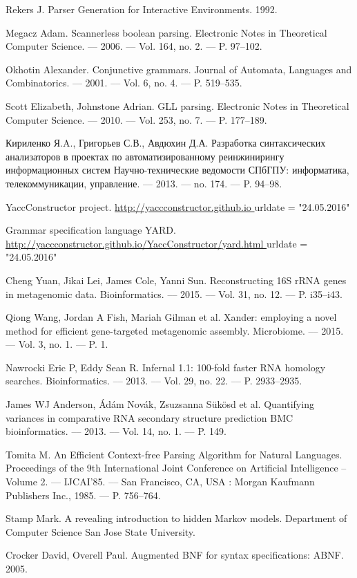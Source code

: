 \begin{thebibliography}{99}


  Rekers J.
  Parser Generation for Interactive Environments. 
  1992.

  Megacz Adam. 
  Scannerless boolean parsing. 
  Electronic Notes in Theoretical Computer Science. –– 2006. –– Vol. 164, no. 2. –– P. 97–102.
  
  Okhotin Alexander. 
  Conjunctive grammars. 
  Journal of Automata, Languages and Combinatorics. –– 2001. –– Vol. 6, no. 4. –– P. 519–535.  

  Scott Elizabeth, Johnstone Adrian. 
  GLL parsing. 
  Electronic Notes in Theoretical Computer Science. –– 2010. –– Vol. 253, no. 7. –– P. 177–189.  

  Кириленко Я.A., Григорьев С.В., Авдюхин Д.А.
  Разработка синтаксических анализаторов в проектах по автоматизированному реинжинирингу информационных систем
  Научно-технические ведомости СПбГПУ: информатика, телекоммуникации, управление. –– 2013. –– no. 174. –– P. 94–98.  

  YaccConstructor project.
  \url{ http://yaccconstructor.github.io }
  urldate = "24.05.2016"

  Grammar specification language YARD.
  \url{ http://yaccconstructor.github.io/YaccConstructor/yard.html }
  urldate = "24.05.2016"

  Cheng Yuan, Jikai Lei, James Cole, Yanni Sun.
  Reconstructing 16S rRNA genes in metagenomic data.
  Bioinformatics. –– 2015. –– Vol. 31, no. 12. –– P. i35–i43.

  Qiong Wang, Jordan A Fish, Mariah Gilman et al. 
  Xander: employing a novel method for efficient gene-targeted metagenomic assembly. 
  Microbiome. –– 2015. –– Vol. 3, no. 1. –– P. 1.  

  Nawrocki Eric P, Eddy Sean R. 
  Infernal 1.1: 100-fold faster RNA homology searches.
  Bioinformatics. –– 2013. –– Vol. 29, no. 22. –– P. 2933–2935.  




  James WJ Anderson, {\'A}d{\'a}m Nov{\'a}k, Zsuzsanna Sükösd et al.
  Quantifying variances in comparative RNA secondary structure prediction 
  BMC bioinformatics. –– 2013. –– Vol. 14, no. 1. –– P. 149.  

  Tomita M.
  An Efficient Context-free Parsing Algorithm for Natural Languages.
  Proceedings of the 9th International Joint Conference on Artificial Intelligence -- Volume 2. –– IJCAI’85. –– San Francisco, CA, USA : Morgan Kaufmann Publishers Inc., 1985. –– P. 756–764.

  Stamp Mark.
  A revealing introduction to hidden Markov models.
  Department of Computer Science San Jose State University.

  Crocker David, Overell Paul. 
  Augmented BNF for syntax specifications: ABNF. 
  2005.

\end{thebibliography}

